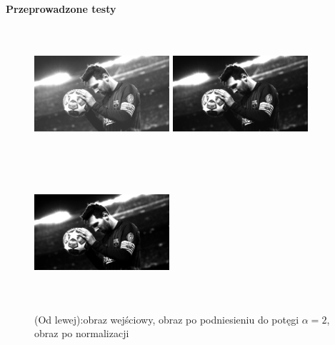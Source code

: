 \documentclass[magisterska,openany]{pracadypl}
\begin{document}
\vspace{0.25cm}\textbf{\Large Przeprowadzone testy}
\vspace{0.5cm}
\begin{figure}[h]
\centering
\includegraphics[width=5cm, height=5cm]{orgi/gMessi.jpg}
\includegraphics[width=5cm, height=5cm]{3_6/powG1.jpg}
\includegraphics[width=5cm, height=5cm]{3_6/npowG1.jpg}
\caption{(Od lewej):obraz wejściowy, obraz po podniesieniu do potęgi $\alpha=2$,
obraz po normalizacji}
\end{figure}
\end{document}
